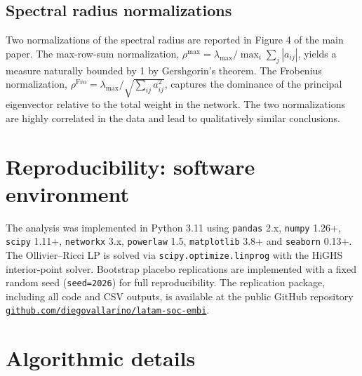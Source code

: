 \documentclass[11pt,a4paper]{article}
\begin{document}
\subsection{Spectral radius normalizations}
Two normalizations of the spectral radius are reported in Figure 4 of the
main paper. The max-row-sum normalization, $\rho^{\max} = \lambda_{\max}/\max_i\sum_j |a_{ij}|$,
yields a measure naturally bounded by 1 by Gershgorin's theorem. The
Frobenius normalization, $\rho^{\mathrm{Fro}} = \lambda_{\max}/\sqrt{\sum_{ij}a_{ij}^2}$,
captures the dominance of the principal eigenvector relative to the total
weight in the network. The two normalizations are highly correlated in the
data and lead to qualitatively similar conclusions.

\section{Reproducibility: software environment}
\label{sec:reproducibility}

The analysis was implemented in Python 3.11 using \texttt{pandas} 2.x,
\texttt{numpy} 1.26+, \texttt{scipy} 1.11+, \texttt{networkx} 3.x,
\texttt{powerlaw} 1.5, \texttt{matplotlib} 3.8+ and \texttt{seaborn} 0.13+.
The Ollivier--Ricci LP is solved via \texttt{scipy.optimize.linprog} with
the HiGHS interior-point solver. Bootstrap placebo replications are
implemented with a fixed random seed (\texttt{seed=2026}) for full
reproducibility. The replication package, including all code and CSV
outputs, is available at the public GitHub repository
\href{https://github.com/diegovallarino/latam-soc-embi}
{\texttt{github.com/diegovallarino/latam-soc-embi}}.

\section{Algorithmic details}
\label{sec:algorithms}
\end{document}
